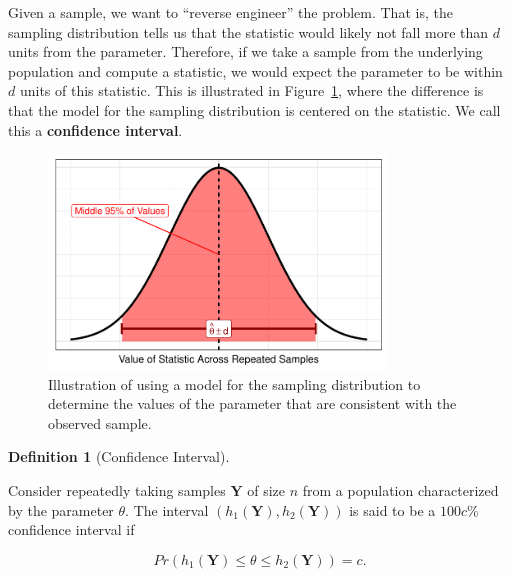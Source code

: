 \documentclass[
  letterpaper,
  DIV=11,
  numbers=noendperiod]{scrreprt}
\theoremstyle{plain}
\theoremstyle{definition}
\newtheorem{definition}{Definition}[chapter]
\theoremstyle{definition}
\theoremstyle{remark}
\begin{document}
Given a sample, we want to ``reverse engineer'' the problem. That is,
the sampling distribution tells us that the statistic would likely not
fall more than \(d\) units from the parameter. Therefore, if we take a
sample from the underlying population and compute a statistic, we would
expect the parameter to be within \(d\) units of this statistic. This is
illustrated in Figure~\ref{fig-inference-model}, where the difference is
that the model for the sampling distribution is centered on the
statistic. We call this a \textbf{confidence interval}.

\begin{figure}

{\centering \includegraphics[width=0.8\textwidth,height=\textheight]{./images/fig-inference-model-1.pdf}

}

\caption{\label{fig-inference-model}Illustration of using a model for
the sampling distribution to determine the values of the parameter that
are consistent with the observed sample.}

\end{figure}

\begin{definition}[Confidence
Interval]\protect\hypertarget{def-confidence-interval}{}\label{def-confidence-interval}

Consider repeatedly taking samples \(\mathbf{Y}\) of size \(n\) from a
population characterized by the parameter \(\theta\). The interval
\(\left(h_1(\mathbf{Y}), h_2(\mathbf{Y})\right)\) is said to be a
\(100c\)\% confidence interval if

\[Pr\left(h_1(\mathbf{Y}) \leq \theta \leq h_2(\mathbf{Y})\right) = c.\]

\end{definition}
\end{document}
